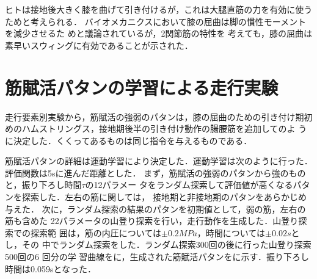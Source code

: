 \documentclass[10pt,a4paper]{jsarticle}
\begin{document}


ヒトは接地後大きく膝を曲げて引き付けるが，これは大腿直筋の力を有効に使うためと考えられる．
バイオメカニクスにおいて膝の屈曲は脚の慣性モーメントを減少させるた
めと議論されている\cite{book:Kaneko:バイオメカニクス}が，2関節筋の特性を
考えても，膝の屈曲は素早いスウィングに有効であることが示された．








\section{筋賦活パタンの学習による走行実験}

走行要素別実験から，筋賦活の強弱のパタンは，膝の屈曲のための引き付け期初
めのハムストリングス，接地期後半の引き付け動作の腸腰筋を追加してのよ
うに決定した．くくってあるものは同じ指令を与えるものである．


筋賦活パタンの詳細は運動学習により決定した．運動学習は次のように行った．
評価関数は5sに進んだ距離とした．
まず，筋賦活の強弱のパタンから強のものと，振り下ろし時間$\tau$の12パラメー
タをランダム探索して評価値が高くなるパタンを探索した．左右の筋に関しては，
接地期と非接地期のパタンをあらかじめ与えた．
次に，ランダム探索の結果のパタンを初期値として，弱の筋，左右の筋も含めた
22パラメータの山登り探索を行い，走行動作を生成した．山登り探索での探索範
囲は，筋の内圧については$\pm0.2MPa$，時間については$\pm0.02s$とし，その
中でランダム探索をした．ランダム探索300回の後に行った山登り探索500回の6
回分の学
習曲線をに，生成された筋賦活パタンをに示す．振り下ろし時間は0.059sとなった．
\end{document}
